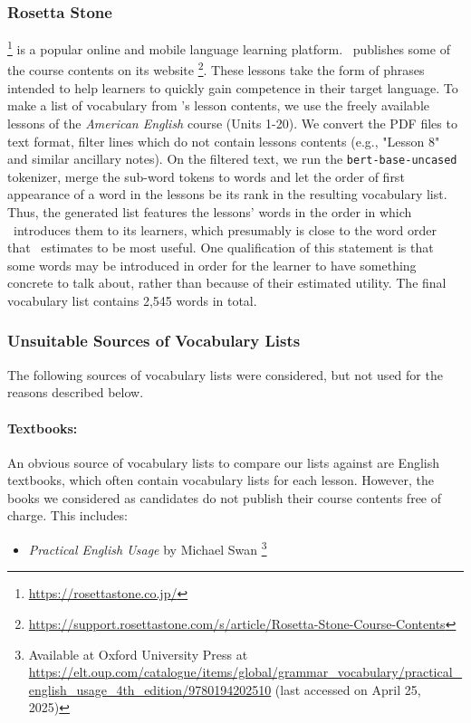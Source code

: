 \subsubsection{Rosetta Stone}
\Rosetta \footnote{\url{https://rosettastone.co.jp/}} is a popular online and mobile language learning platform.
\Rosetta\ publishes some of the course contents on its website \footnote{\url{https://support.rosettastone.com/s/article/Rosetta-Stone-Course-Contents}}.
These lessons take the form of phrases intended to help learners to quickly gain competence in their target language.
To make a list of vocabulary from \Rosetta 's lesson contents, we use the freely available lessons  of the \textit{American English} course (Units 1-20).
We convert the PDF files to text format, filter lines which do not contain lessons contents (e.g., "Lesson 8" and similar ancillary notes).
On the filtered text, we run the \texttt{bert-base-uncased} tokenizer, merge the sub-word tokens to words and let the order of first appearance of a word in the lessons be its rank in the resulting vocabulary list.
Thus, the generated list features the lessons' words in the order in which \Rosetta\ introduces them to its learners, which presumably is close to the word order that \Rosetta\ estimates to be most useful.
One qualification of this statement is that some words may be introduced in order for the learner to have something concrete to talk about, rather than because of their estimated utility.
The final vocabulary list contains 2,545 words in total.

\subsubsection{Unsuitable Sources of Vocabulary Lists}
The following sources of vocabulary lists were considered, but not used for the reasons described below.

\paragraph{Textbooks:}
An obvious source of vocabulary lists to compare our lists against are English textbooks, which often contain vocabulary lists for each lesson.
However, the books we considered as candidates do not publish their course contents free of charge.
This includes:
\begin{itemize}
	\item \textit{Practical English Usage} by Michael Swan \footnote{Available at Oxford University Press at \url{https://elt.oup.com/catalogue/items/global/grammar_vocabulary/practical_english_usage_4th_edition/9780194202510} (last accessed on April 25, 2025)}
\end{itemize}

